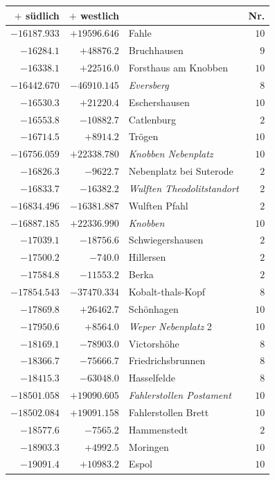 \begin{center}\begingroup\fontsize{8}{9}\selectfont
\setlength{\tabcolsep}{4pt}
\begin{tabular}{r|r|p{170pt}|r}\hline
\(+\) südlich&\(+\) westlich&&Nr.\\\hline
\(-16187.933\)&\(+19596.646\)&Fahle&\(10\)\\
\(-16284.1\)&\(+48876.2\)&Bruchhausen&\(9\)\\
\(-16338.1\)&\(+22516.0\)&Forsthaus am Knobben&\(10\)\\
\(-16442.670\)&\(-46910.145\)&\textit{Eversberg}&\(8\)\\
\(-16530.3\)&\(+21220.4\)&Eschershausen&\(10\)\\
\(-16553.8\)&\(-10882.7\)&Catlenburg&\(2\)\\
\(-16714.5\)&\(+8914.2\)&Trögen&\(10\)\\
\(-16756.059\)&\(+22338.780\)&\textit{Knobben Nebenplatz}&\(10\)\\
\(-16826.3\)&\(-9622.7\)&Nebenplatz bei Suterode&\(2\)\\
\(-16833.7\)&\(-16382.2\)&\textit{Wulften Theodolitstandort}&\(2\)\\
\(-16834.496\)&\(-16381.887\)&Wulften Pfahl&\(2\)\\
\(-16887.185\)&\(+22336.990\)&\textit{Knobben}&\(10\)\\
\(-17039.1\)&\(-18756.6\)&Schwiegershausen&\(2\)\\
\(-17500.2\)&\(-740.0\)&Hillersen&\(2\)\\
\(-17584.8\)&\(-11553.2\)&Berka&\(2\)\\
\(-17854.543\)&\(-37470.334\)&Kobalt-thals-Kopf&\(8\)\\
\(-17869.8\)&\(+26462.7\)&Schönhagen&\(10\)\\
\(-17950.6\)&\(+8564.0\)&\textit{Weper Nebenplatz} 2&\(10\)\\
\(-18169.1\)&\(-78903.0\)&Victorshöhe&\(8\)\\
\(-18366.7\)&\(-75666.7\)&Friedrichsbrunnen&\(8\)\\
\(-18415.3\)&\(-63048.0\)&Hasselfelde&\(8\)\\
\(-18501.058\)&\(+19090.605\)&\textit{Fahlerstollen Postament}&\(10\)\\
\(-18502.084\)&\(+19091.158\)&Fahlerstollen Brett&\(10\)\\
\(-18577.6\)&\(-7565.2\)&Hammenstedt&\(2\)\\
\(-18903.3\)&\(+4992.5\)&Moringen&\(10\)\\
\(-19091.4\)&\(+10983.2\)&Espol&\(10\)\\

\end{tabular}
\end{center}
